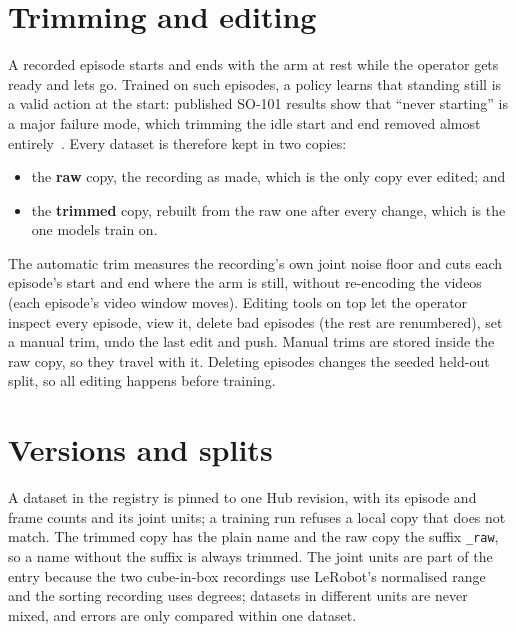 \section{Trimming and editing}\label{sec:trimming}

A recorded episode starts and ends with the arm at rest while the operator gets ready and lets go. Trained on such
episodes, a policy learns that standing still is a valid action at the start: published SO-101 results show that
\enquote{never starting} is a major failure mode, which trimming the idle start and end removed almost
entirely~\cite{valloss2026}. Every dataset is therefore kept in two copies:
\begin{itemize}
\item the \textbf{raw} copy, the recording as made, which is the only copy ever edited; and
\item the \textbf{trimmed} copy, rebuilt from the raw one after every change, which is the one models train on.
\end{itemize}
The automatic trim measures the recording's own joint noise floor and cuts each episode's start and end where the arm
is still, without re-encoding the videos (each episode's video window moves). Editing tools on top let the operator
inspect every episode, view it, delete bad episodes (the rest are renumbered), set a manual trim, undo the last edit
and push. Manual trims are stored inside the raw copy, so they travel with it. Deleting episodes changes the seeded
held-out split, so all editing happens before training.

\section{Versions and splits}\label{sec:versions}

A dataset in the registry is pinned to one Hub revision, with its episode and frame counts and its joint units; a
training run refuses a local copy that does not match. The trimmed copy has the plain name and the raw copy the suffix
\texttt{\_raw}, so a name without the suffix is always trimmed. The joint units are part of the entry because the two
cube-in-box recordings use LeRobot's normalised range and the sorting recording uses degrees; datasets in different
units are never mixed, and errors are only compared within one dataset.


